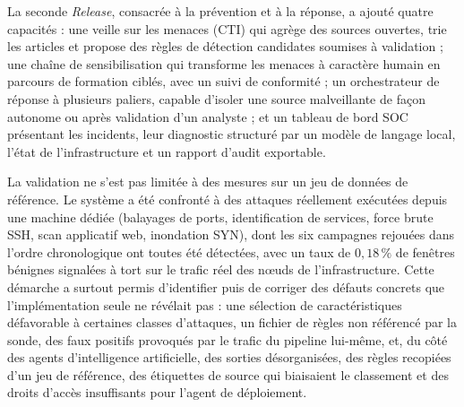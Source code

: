 La seconde \textit{Release}, consacrée à la prévention et à la réponse, a ajouté quatre capacités : une veille sur les menaces (CTI) qui agrège des sources ouvertes, trie les articles et propose des règles de détection candidates soumises à validation ; une chaîne de sensibilisation qui transforme les menaces à caractère humain en parcours de formation ciblés, avec un suivi de conformité ; un orchestrateur de réponse à plusieurs paliers, capable d'isoler une source malveillante de façon autonome ou après validation d'un analyste ; et un tableau de bord SOC présentant les incidents, leur diagnostic structuré par un modèle de langage local, l'état de l'infrastructure et un rapport d'audit exportable.

La validation ne s'est pas limitée à des mesures sur un jeu de données de référence. Le système a été confronté à des attaques réellement exécutées depuis une machine dédiée (balayages de ports, identification de services, force brute SSH, scan applicatif web, inondation SYN), dont les six campagnes rejouées dans l'ordre chronologique ont toutes été détectées, avec un taux de $0{,}18\,\%$ de fenêtres bénignes signalées à tort sur le trafic réel des nœuds de l'infrastructure. Cette démarche a surtout permis d'identifier puis de corriger des défauts concrets que l'implémentation seule ne révélait pas : une sélection de caractéristiques défavorable à certaines classes d'attaques, un fichier de règles non référencé par la sonde, des faux positifs provoqués par le trafic du pipeline lui-même, et, du côté des agents d'intelligence artificielle, des sorties désorganisées, des règles recopiées d'un jeu de référence, des étiquettes de source qui biaisaient le classement et des droits d'accès insuffisants pour l'agent de déploiement.

